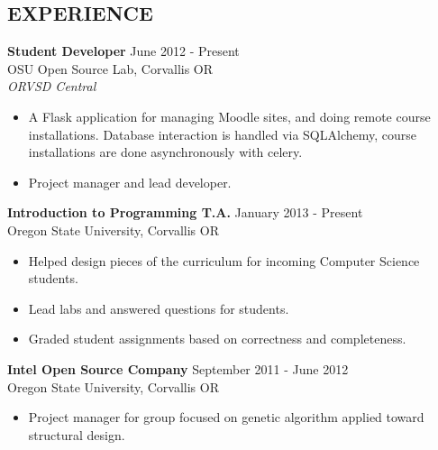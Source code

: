 \documentclass[margin]{res}
\begin{document}
\begin{resume}
\section{EXPERIENCE} 
                \textbf{Student Developer} \hfill June 2012 - Present \\
                OSU Open Source Lab, Corvallis OR \\
                {\sl ORVSD Central} 
                \begin{itemize}  \itemsep -2pt %
                    \item A Flask application for managing Moodle sites, and doing remote course installations.
                          Database interaction is handled via SQLAlchemy, course installations are done asynchronously 
                          with celery.
                    \item Project manager and lead developer.
                \end{itemize}
                \textbf{Introduction to Programming T.A.}  \hfill January 2013 - Present  \\
                Oregon State University, Corvallis OR
                \begin{itemize}  \itemsep -2pt %
                \item Helped design pieces of the curriculum for incoming Computer Science students.
                \item Lead labs and answered questions for students.
                \item Graded student assignments based on correctness and completeness.
                \end{itemize} 
                \textbf {Intel Open Source Company} \hfill September 2011 - June 2012 \\
                Oregon State University, Corvallis OR 
                   \begin{itemize} \itemsep -2pt
                    \item Project manager for group focused on genetic algorithm applied toward structural design.
                    \end{itemize} 
  

\end{resume}
\end{document}
